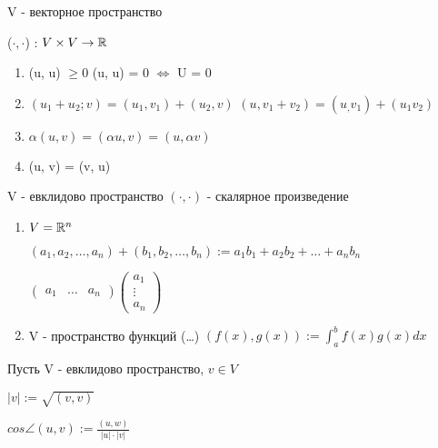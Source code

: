\begin{definition}
    V - векторное пространство

    ($\cdot, \cdot$) : $V \times V \to \mathbb{R}$

    \begin{enumerate}
        \item (u, u) $\geq 0$
        (u, u) = 0 $\Leftrightarrow$ U = 0

        \item $(u_1 + u_2; v) = (u_1, v_1) + (u_2, v)$
        $(u, v_1 + v_2) = (u_, v_1) + (u_1 v_2)$

        \item $\alpha(u, v) = (\alpha u, v) = (u, \alpha v)$
        \item (u, v) = (v, u)
    \end{enumerate}

    V - евклидово пространство
    $(\cdot, \cdot)$ - скалярное произведение
\end{definition}

\begin{eg}
    \begin{enumerate}
        \item $ V = \mathbb{R}^n $
        
        $(a_1, a_2, \ldots, a_n) + (b_1, b_2, \ldots, b_n) := a_1 b_1 + a_2 b_2 + \ldots + a_n b_n$

        
    $\left(
    \begin{array}{ccc}
        a_1 & \ldots & a_n
    \end{array}\right) \left(
                \begin{array}{c}
                    a_1\\
                    \vdots\\
                    a_n
                \end{array}
                \right)$

        \item V - пространство функций (\ldots) 
        $(f(x), g(x)) := \int_a^b f(x)g(x)dx$
    \end{enumerate}
\end{eg}

\begin{definition}
    Пусть V - евклидово пространство, $v \in V$
    
    $|v| := \sqrt{ (v, v) }$

    $cos\angle(u, v) := \frac{(u, w)}{|u| \cdot |v|}$



\end{definition}

